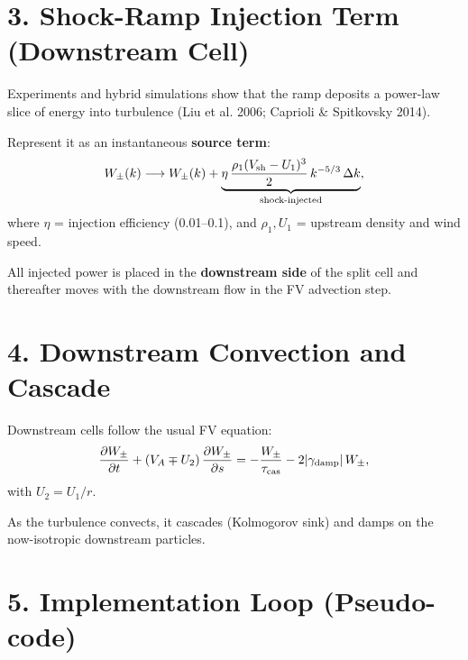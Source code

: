 \section*{3. Shock-Ramp Injection Term (Downstream Cell)}

Experiments and hybrid simulations show that the ramp deposits a power-law slice of energy into turbulence (Liu et al. 2006; Caprioli \& Spitkovsky 2014).

Represent it as an instantaneous \textbf{source term}:
\[
W_\pm(k) \longrightarrow
W_\pm(k) + \underbrace{\eta\,\frac{\rho_1 (V_{\rm sh} - U_1)^3}{2}\,
k^{-5/3}\,\Delta k}_{\text{shock-injected}},
\]
where $\eta$ = injection efficiency (0.01–0.1), and $\rho_1, U_1$ = upstream density and wind speed.

\noindent All injected power is placed in the \textbf{downstream side} of the split cell and thereafter moves with the downstream flow in the FV advection step.

\section*{4. Downstream Convection and Cascade}

Downstream cells follow the usual FV equation:
\[
\frac{\partial W_\pm}{\partial t}
      + (V_A \mp U_2)\,\frac{\partial W_\pm}{\partial s}
      = -\frac{W_\pm}{\tau_{\rm cas}}
      -2|\gamma_{\rm damp}|\,W_\pm,
\]
with $U_2 = U_1 / r$.

\noindent As the turbulence convects, it cascades (Kolmogorov sink) and damps on the now-isotropic downstream particles.

\section*{5. Implementation Loop (Pseudo-code)}

